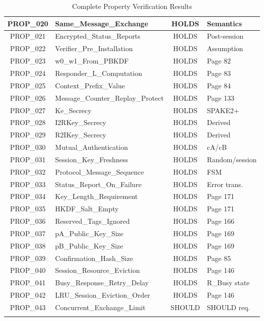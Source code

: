 \documentclass[11pt,a4paper]{article}
\begin{document}
\begin{longtable}{|c|l|c|l|}
\hline
PROP\_020 & Same\_Message\_Exchange & \textcolor{successgreen}{HOLDS} & Semantics \\
\hline
PROP\_021 & Encrypted\_Status\_Reports & \textcolor{successgreen}{HOLDS} & Post-session \\
\hline
PROP\_022 & Verifier\_Pre\_Installation & \textcolor{successgreen}{HOLDS} & Assumption \\
\hline
PROP\_023 & w0\_w1\_From\_PBKDF & \textcolor{successgreen}{HOLDS} & Page 82 \\
\hline
PROP\_024 & Responder\_L\_Computation & \textcolor{successgreen}{HOLDS} & Page 83 \\
\hline
PROP\_025 & Context\_Prefix\_Value & \textcolor{successgreen}{HOLDS} & Page 84 \\
\hline
PROP\_026 & Message\_Counter\_Replay\_Protect & \textcolor{successgreen}{HOLDS} & Page 133 \\
\hline
PROP\_027 & Ke\_Secrecy & \textcolor{successgreen}{HOLDS} & SPAKE2+ \\
\hline
PROP\_028 & I2RKey\_Secrecy & \textcolor{successgreen}{HOLDS} & Derived \\
\hline
PROP\_029 & R2IKey\_Secrecy & \textcolor{successgreen}{HOLDS} & Derived \\
\hline
PROP\_030 & Mutual\_Authentication & \textcolor{successgreen}{HOLDS} & cA/cB \\
\hline
PROP\_031 & Session\_Key\_Freshness & \textcolor{successgreen}{HOLDS} & Random/session \\
\hline
PROP\_032 & Protocol\_Message\_Sequence & \textcolor{successgreen}{HOLDS} & FSM \\
\hline
PROP\_033 & Status\_Report\_On\_Failure & \textcolor{successgreen}{HOLDS} & Error trans. \\
\hline
PROP\_034 & Key\_Length\_Requirement & \textcolor{successgreen}{HOLDS} & Page 171 \\
\hline
PROP\_035 & HKDF\_Salt\_Empty & \textcolor{successgreen}{HOLDS} & Page 171 \\
\hline
PROP\_036 & Reserved\_Tags\_Ignored & \textcolor{successgreen}{HOLDS} & Page 166 \\
\hline
PROP\_037 & pA\_Public\_Key\_Size & \textcolor{successgreen}{HOLDS} & Page 169 \\
\hline
PROP\_038 & pB\_Public\_Key\_Size & \textcolor{successgreen}{HOLDS} & Page 169 \\
\hline
PROP\_039 & Confirmation\_Hash\_Size & \textcolor{successgreen}{HOLDS} & Page 85 \\
\hline
PROP\_040 & Session\_Resource\_Eviction & \textcolor{successgreen}{HOLDS} & Page 146 \\
\hline
PROP\_041 & Busy\_Response\_Retry\_Delay & \textcolor{successgreen}{HOLDS} & R\_Busy state \\
\hline
PROP\_042 & LRU\_Session\_Eviction\_Order & \textcolor{successgreen}{HOLDS} & Page 146 \\
\hline
PROP\_043 & Concurrent\_Exchange\_Limit & \textcolor{matterblue}{SHOULD} & SHOULD req. \\
\hline

\caption{Complete Property Verification Results}
\end{longtable}
\end{document}
